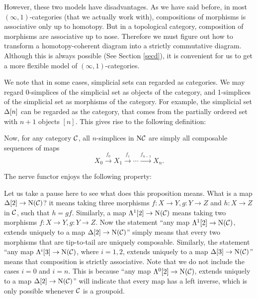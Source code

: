 However, these two models have disadvantages. As we have said before, in most $(\infty,1)$-categories (that we actually work with), compositions
of morphisms is associative only up to homotopy. But in a topological category, composition of morphisms are associative up to nose. 
Therefore we must figure out how to transform a homotopy-coherent diagram into a strictly commutative diagram. Although this is always
possible (See Section \ref{secd}), it is convenient for us to get a more flexible model 
of $(\infty,1)$-categories.

We note that in some cases, simplicial sets can regarded as categories. We may regard 0-simplices of the simplicial set as objects of the category,
and 1-simplices of the simplicial set as morphisms of the category. For example, the simplicial set $\Delta[n]$ can be regarded as the category, 
that comes from the partially ordered set with $n+1$ objects $[n]$. This gives rise to the following definition:


Now, for any category $\mathcal{C}$, all $n$-simplices in $\mathrm{N}\mathcal{C}$ are simply all composable sequences of maps 
$$X_0\xrightarrow{f_0}X_1\xrightarrow{f_1}\cdots\xrightarrow{f_{n-1}}X_n.$$

The nerve functor enjoys the following property:


Let us take a pause here to see what does this proposition means. What is a map $\Delta[2]\to \mathrm{N}(\mathcal{C})$? it means taking three morphisms
$f:X\to Y,g:Y\to Z$ and $h:X\to Z$ in $\mathcal{C}$, such that $h=gf$. Similarly, a map $\Lambda^1[2]\to \mathrm{N}(\mathcal{C})$ means taking two morphisms 
$f:X\to Y,g:Y\to Z$. Now the statement ``any map $\Lambda^1[2]\to \mathrm{N}(\mathcal{C})$, extends uniquely to a map $\Delta[2]\to \mathrm{N}(\mathcal{C})$''
simply means that every two morphisms that are tip-to-tail are uniquely composable. Similarly, the statement ``any map $\Lambda^i[3]\to \mathrm{N}(\mathcal{C})$,
where $i=1,2$, extends uniquely to a map $\Delta[3]\to \mathrm{N}(\mathcal{C})$'' means that composition is strictly associative. Note that we do not
include the cases $i=0$ and $i=n$. This is because ``any map $\Lambda^0[2]\to \mathrm{N}(\mathcal{C})$, extends uniquely to a map $\Delta[2]\to \mathrm{N}(\mathcal{C})$''
will indicate that every map has a left inverse, which is only possible whenever $\mathcal{C}$ is a groupoid.

